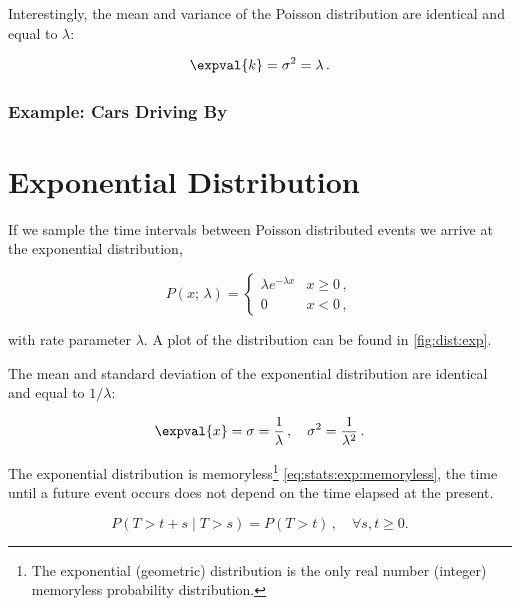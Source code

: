 Interestingly, the mean and variance of the Poisson distribution are identical and equal to $\lambda$:

\begin{equation}\label{eq:stats:poisson:mean_variance}
\expval{k} = \sigma^{2} = \lambda\,.
\end{equation}

\subsubsection{Example: Cars Driving By}
\label{stats:poisson:cars}

\section{Exponential Distribution}
\label{stats:exp}

If we sample the time intervals between Poisson distributed events
we arrive at the exponential distribution,

\begin{equation}\label{eq:stats:exp:P}
P\left(x;\,\lambda\right) = \begin{cases}
\lambda e^{-\lambda x} & x \geq 0 \,, \\
0 & x < 0 \,,
\end{cases}
\end{equation}

\noindent with rate parameter $\lambda$.
A plot of the distribution can be found in \cref{fig:dist:exp}.

The mean and standard deviation of the exponential distribution are identical and equal to $1/\lambda$:

\begin{equation}\label{eq:stats:exp:mean_variance}
\expval{x} = \sigma = \frac{1}{\lambda}\,, \quad \sigma^{2} = \frac{1}{\lambda^{2}}\,.
\end{equation}

The exponential distribution is memoryless\footnote{The exponential (geometric) distribution is the only real number (integer) memoryless probability distribution.} \cref{eq:stats:exp:memoryless},
\ie the time until a future event occurs does not depend on the time elapsed at the present.

\begin{equation}\label{eq:stats:exp:memoryless}
P\left(T > t + s \mid T > s\right) = P\left(T > t\right)\,, \quad \forall s,t \geq 0.
\end{equation}

